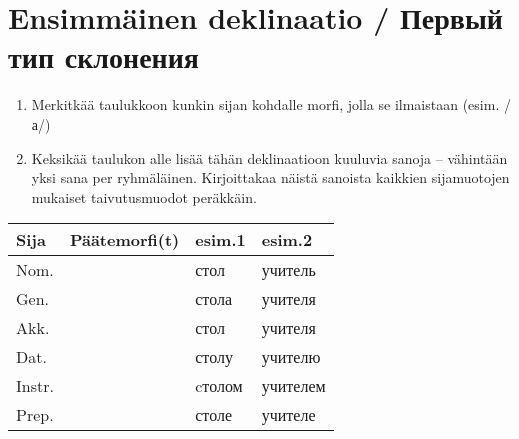 \documentclass[paper=a4, fontsize=11pt]{scrartcl}
\providecommand{\tightlist}{%
  \setlength{\itemsep}{0pt}\setlength{\parskip}{0pt}}
\begin{document}
\section{Ensimmäinen deklinaatio / Первый тип
склонения}\label{ensimmuxe4inen-deklinaatio-ux43fux435ux440ux432ux44bux439-ux442ux438ux43f-ux441ux43aux43bux43eux43dux435ux43dux438ux44f}

\begin{enumerate}
\def\labelenumi{\arabic{enumi}.}
\tightlist
\item
  Merkitkää taulukkoon kunkin sijan kohdalle morfi, jolla se ilmaistaan
  (esim. /а/)
\item
  Keksikää taulukon alle lisää tähän deklinaatioon kuuluvia sanoja --
  vähintään yksi sana per ryhmäläinen. Kirjoittakaa näistä sanoista kaikkien
  sijamuotojen mukaiset taivutusmuodot peräkkäin.
\end{enumerate}


{
\begin{longtable}[c]{@{}llll@{}}
\toprule
Sija & Päätemorfi(t) & esim.1 & esim.2\tabularnewline
\midrule
\endhead
Nom. & & стол & учитель\tabularnewline
Gen. & & стола & учителя\tabularnewline
Akk. & & стол & учителя\tabularnewline
Dat. & & столу & учителю\tabularnewline
Instr. & & cтолом & учителем\tabularnewline
Prep. & & столе & учителе\tabularnewline
\bottomrule
\end{longtable}
}


\begin{center}

\vspace{1.1cm} 

\underline{\hspace{12cm}} \\
\vspace{0.5cm}
\underline{\hspace{12cm}} \\
\vspace{0.5cm}
\underline{\hspace{12cm}} \\
\vspace{0.5cm}
\underline{\hspace{12cm}} \\
\vspace{0.5cm}
\underline{\hspace{12cm}} \\
\vspace{0.5cm}
\underline{\hspace{12cm}} \\
\vspace{0.5cm}
\underline{\hspace{12cm}} \\
\vspace{0.5cm}
\underline{\hspace{12cm}} \\
\vspace{0.5cm}
\underline{\hspace{12cm}} \\

\end{center}
\end{document}
